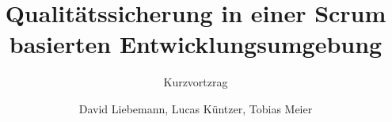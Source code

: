 \documentclass{beamer}
\title{Qualitätssicherung in einer Scrum basierten Entwicklungsumgebung}
\subtitle{Kurzvortzrag}
\author{David Liebemann, Lucas Küntzer, Tobias Meier}
\institute{Fachhochschule Trier}
\begin{document}
\begin{frame}
\titlepage
\end{frame}

\begin{frame}

\end{frame}
\end{document}
